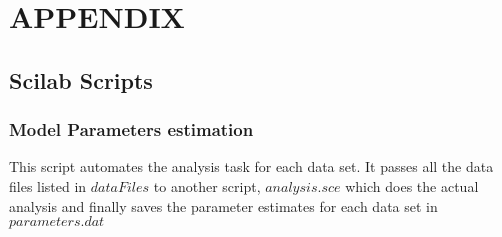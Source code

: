\clearpage
\appendix
\section{APPENDIX}
\label{sec:appendix}


\subsection{Scilab Scripts}
\label{sec:scilabScripts}

\subsubsection{Model Parameters estimation}
\label{sec:modelParamEst}
This script automates the analysis task for each data set. It passes all the data files listed in $dataFiles$ to another script, $analysis.sce$ which does the actual analysis and finally saves the parameter estimates for each data set in $parameters.dat$

